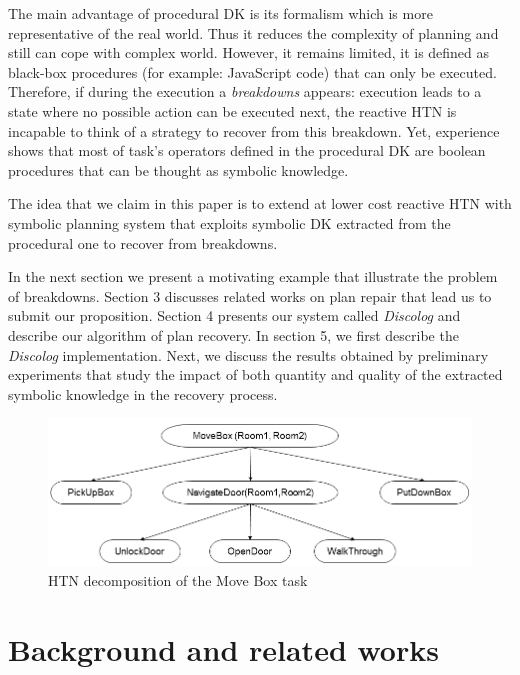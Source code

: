 \documentclass{llncs}
\begin{document}
		The main advantage of procedural DK is its formalism which is more representative of the real world. Thus it reduces the complexity of planning and still can cope with complex world. However, it remains limited, it is defined as black-box procedures (for example: JavaScript code) that can only be executed. Therefore, if during the execution a \emph{breakdowns} appears: execution leads to a state where no possible action can be executed next, the reactive HTN is incapable to think of a strategy to recover from this breakdown. Yet, experience shows that most of task's operators defined in the procedural DK are boolean procedures that can be thought as symbolic knowledge. 
		\par The idea that we claim in this paper is to extend at lower cost reactive HTN with symbolic planning system that exploits symbolic DK extracted from the procedural one to recover from breakdowns. 
		\par In the next section we present a motivating example that illustrate the problem of breakdowns. Section 3 discusses related works on plan repair that lead us to submit our proposition. Section 4 presents our system called \emph{Discolog} and describe our algorithm of plan recovery. In section 5, we first  describe the \textit{Discolog} implementation. Next, we discuss the results obtained by  preliminary experiments that study the impact of both quantity and quality of the extracted symbolic knowledge in the recovery process.  
			\begin{figure}[t]
				\centering
				\includegraphics[width=\textwidth , scale=0.4]{Figures/fig1.png}
				\caption{HTN decomposition of the Move Box task}
				\label{Fig:repair}
			\end{figure}
		
		\section{Background and related works}
		
\end{document}
